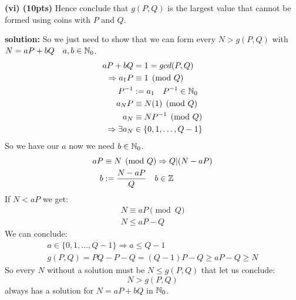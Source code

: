 \documentclass{article}
\begin{document}
\textbf{(vi) (10pts)}
Hence conclude that $g(P,Q)$ is the largest value that cannot be 
formed using coins with $P$ and $Q$.

\textbf{solution:}
So we just need to show that we can form every
$N > g(P,Q)$ with $N = aP + bQ \hspace{10pt} a,b \in \mathbb{N}_{0}$.
\begin{align*}
    aP + bQ &= 1 = gcd(P,Q)\\
    \Rightarrow
    a_{1} P &\equiv 1 \pmod{Q} \\
    P^{-1} &:= a_{1} \hspace{10pt} P^{-1} \in \mathbb{N}_{0} \\
    a_{N}P &\equiv N(1) \pmod{Q} \\
    a_{N} &\equiv N P^{-1} \pmod{Q} \\
    \Rightarrow
    \exists a_{N} &\in \{0,1,\dots,Q-1\}
\end{align*}
So we have our $a$ now we need $b \in \mathbb{N}_{0}$.
\begin{align*}
    aP &\equiv N \pmod{Q} 
    \Rightarrow
    Q | (N- aP)\\
    b &:= \frac{N - aP}{Q} \hspace{10pt} b \in \mathbb{Z}
\end{align*}
If $N < aP$ we get:
\begin{align*}
    N \equiv aP \pmod{Q} \\
    N \leq aP - Q
\end{align*}
We can conclude:
\begin{align*}
    a \in \{0,1,\dots,Q-1\}
    \Rightarrow a \leq Q-1 \\
    g(P,Q) = PQ - P - Q = (Q-1)P - Q
    \geq aP - Q \geq N
\end{align*}
So every $N$ without a solution must be $N \leq g(P,Q)$
that let us conclude: 
\[N>g(P,Q)\] 
always has a solution for $N=aP+bQ$ in $\mathbb{N}_{0}$.
\end{document}
